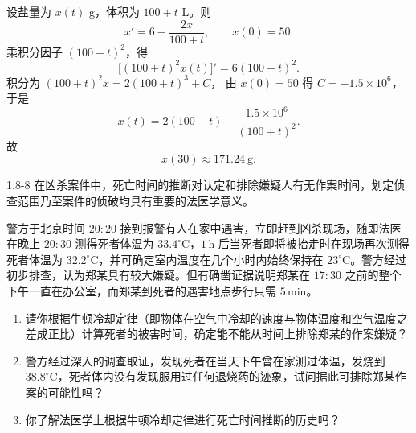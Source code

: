 \documentclass[UTF8,a4paper,11pt]{ctexart}
\begin{document}
\begin{solution}
设盐量为 $x(t)$ g，体积为 $100+t$ L。则
\[
x'=6-\frac{2x}{100+t},\qquad x(0)=50.
\]
乘积分因子 $(100+t)^2$，得
\[
\bigl[(100+t)^2x(t)\bigr]'=6(100+t)^2.
\]
积分为 $(100+t)^2x=2(100+t)^3+C$，
由 $x(0)=50$ 得 $C=-1.5\times10^6$，于是
\[
x(t)=2(100+t)-\frac{1.5\times10^6}{(100+t)^2}.
\]
故
\[
\boxed{x(30)\approx171.24\ \mathrm g}.
\]
\end{solution}

\begin{problem}{1.8-8}
在凶杀案件中，死亡时间的推断对认定和排除嫌疑人有无作案时间，划定侦查范围乃至案件的侦破均具有重要的法医学意义。

  警方于北京时间 $20{:}20$ 接到报警有人在家中遇害，立即赶到凶杀现场，随即法医在晚上 $20{:}30$ 测得死者体温为 $33.4^\circ\mathrm C$，$1\,\mathrm h$ 后当死者即将被抬走时在现场再次测得死者体温为 $32.2^\circ\mathrm C$，并可确定室内温度在几个小时内始终保持在 $23^\circ\mathrm C$。警方经过初步排查，认为郑某具有较大嫌疑。但有确凿证据说明郑某在 $17{:}30$ 之前的整个下午一直在办公室，而郑某到死者的遇害地点步行只需 $5\,\mathrm{min}$。
  \begin{enumerate}[label=(\arabic*)]
    \item 请你根据牛顿冷却定律（即物体在空气中冷却的速度与物体温度和空气温度之差成正比）计算死者的被害时间，确定能不能从时间上排除郑某的作案嫌疑？
    \item 警方经过深入的调查取证，发现死者在当天下午曾在家测过体温，发烧到 $38.8^\circ\mathrm C$，死者体内没有发现服用过任何退烧药的迹象，试问据此可排除郑某作案的可能性吗？
    \item 你了解法医学上根据牛顿冷却定律进行死亡时间推断的历史吗？
  \end{enumerate}
\end{problem}
\end{document}
